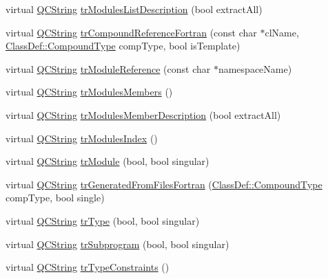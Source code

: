 \begin{DoxyCompactItemize}
virtual \mbox{\hyperlink{class_q_c_string}{Q\+C\+String}} \mbox{\hyperlink{class_translator_korean_a74f558d5fab07ab025eb2d83cbafc981}{tr\+Modules\+List\+Description}} (bool extract\+All)
\item 
virtual \mbox{\hyperlink{class_q_c_string}{Q\+C\+String}} \mbox{\hyperlink{class_translator_korean_a74bed2b0376f1726b31adc4241559f14}{tr\+Compound\+Reference\+Fortran}} (const char $\ast$cl\+Name, \mbox{\hyperlink{class_class_def_ae70cf86d35fe954a94c566fbcfc87939}{Class\+Def\+::\+Compound\+Type}} comp\+Type, bool is\+Template)
\item 
virtual \mbox{\hyperlink{class_q_c_string}{Q\+C\+String}} \mbox{\hyperlink{class_translator_korean_acaf8215a2008b2a3dd13916be0dbc3f3}{tr\+Module\+Reference}} (const char $\ast$namespace\+Name)
\item 
virtual \mbox{\hyperlink{class_q_c_string}{Q\+C\+String}} \mbox{\hyperlink{class_translator_korean_a7fec794c7eb28db63dd2815204a11cb3}{tr\+Modules\+Members}} ()
\item 
virtual \mbox{\hyperlink{class_q_c_string}{Q\+C\+String}} \mbox{\hyperlink{class_translator_korean_a9d1ea9e499810c8dbc812fc976cd583a}{tr\+Modules\+Member\+Description}} (bool extract\+All)
\item 
virtual \mbox{\hyperlink{class_q_c_string}{Q\+C\+String}} \mbox{\hyperlink{class_translator_korean_a27ed6bf015e7486973035b3a4dc79707}{tr\+Modules\+Index}} ()
\item 
virtual \mbox{\hyperlink{class_q_c_string}{Q\+C\+String}} \mbox{\hyperlink{class_translator_korean_a040e4dc351893d295b522fae7fa52ece}{tr\+Module}} (bool, bool singular)
\item 
virtual \mbox{\hyperlink{class_q_c_string}{Q\+C\+String}} \mbox{\hyperlink{class_translator_korean_a9fe58e5e96a6f39f6c2b702c4998b5da}{tr\+Generated\+From\+Files\+Fortran}} (\mbox{\hyperlink{class_class_def_ae70cf86d35fe954a94c566fbcfc87939}{Class\+Def\+::\+Compound\+Type}} comp\+Type, bool single)
\item 
virtual \mbox{\hyperlink{class_q_c_string}{Q\+C\+String}} \mbox{\hyperlink{class_translator_korean_a6cf3e25885e35207ff84754d5d684fa1}{tr\+Type}} (bool, bool singular)
\item 
virtual \mbox{\hyperlink{class_q_c_string}{Q\+C\+String}} \mbox{\hyperlink{class_translator_korean_a78b10bbfbcbdf7f747c0dc98944e2686}{tr\+Subprogram}} (bool, bool singular)
\item 
virtual \mbox{\hyperlink{class_q_c_string}{Q\+C\+String}} \mbox{\hyperlink{class_translator_korean_a40330c41363d6d093241961165b9da30}{tr\+Type\+Constraints}} ()

\end{DoxyCompactItemize}
